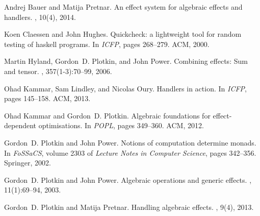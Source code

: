 \documentclass[a4paper,UKenglish]{dagrep}
\begin{document}
\begin{thebibliography}{1}

Andrej Bauer and Matija Pretnar.
\newblock An effect system for algebraic effects and handlers.
, 10(4), 2014.

Koen Claessen and John Hughes.
\newblock Quickcheck: a lightweight tool for random testing of haskell
  programs.
\newblock In {\em {ICFP}}, pages 268--279. {ACM}, 2000.

Martin Hyland, Gordon~D. Plotkin, and John Power.
\newblock Combining effects: Sum and tensor.
, 357(1-3):70--99, 2006.

Ohad Kammar, Sam Lindley, and Nicolas Oury.
\newblock Handlers in action.
\newblock In {\em {ICFP}}, pages 145--158. {ACM}, 2013.

Ohad Kammar and Gordon~D. Plotkin.
\newblock Algebraic foundations for effect-dependent optimisations.
\newblock In {\em {POPL}}, pages 349--360. {ACM}, 2012.

Gordon~D. Plotkin and John Power.
\newblock Notions of computation determine monads.
\newblock In {\em FoSSaCS}, volume 2303 of {\em Lecture Notes in Computer
  Science}, pages 342--356. Springer, 2002.

Gordon~D. Plotkin and John Power.
\newblock Algebraic operations and generic effects.
, 11(1):69--94, 2003.

Gordon~D. Plotkin and Matija Pretnar.
\newblock Handling algebraic effects.
, 9(4), 2013.

\end{thebibliography}

\end{document}
